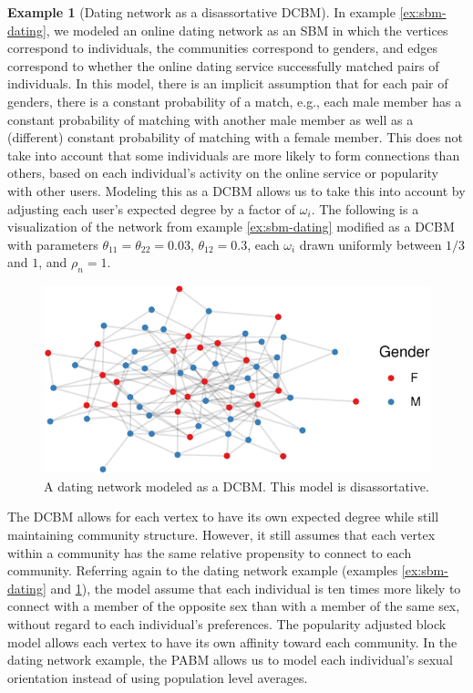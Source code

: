 \documentclass[
  12pt,
]{article}
\theoremstyle{definition}
\theoremstyle{definition}
\newtheorem{example}{Example}[section]
\theoremstyle{definition}
\theoremstyle{definition}
\theoremstyle{remark}
\begin{document}
\begin{example}[Dating network as a disassortative DCBM]
\label{ex:dcbm-dating}
In example \ref{ex:sbm-dating}, we modeled an online dating network as an SBM in which the vertices correspond to individuals, the communities correspond to genders, and edges correspond to whether the online dating service successfully matched pairs of individuals. 
In this model, there is an implicit assumption that for each pair of genders, there is a constant probability of a match, e.g., each male member has a constant probability of matching with another male member as well as a (different) constant probability of matching with a female member. 
This does not take into account that some individuals are more likely to form connections than others, based on each individual's activity on the online service or popularity with other users. 
Modeling this as a DCBM allows us to take this into account by adjusting each user's expected degree by a factor of $\omega_i$. 
The following is a visualization of the network from example \ref{ex:sbm-dating} modified as a DCBM with parameters $\theta_{11} = \theta_{22} = 0.03$, $\theta_{12} = 0.3$, each $\omega_i$ drawn uniformly between $1/3$ and $1$, and $\rho_n = 1$. 

\begin{figure}[H]

{\centering \includegraphics{draft_files/figure-latex/dating-dcbm-1} 

}

\caption{A dating network modeled as a DCBM. This model is disassortative.}\label{fig:dating-dcbm}
\end{figure}
\end{example}

The DCBM allows for each vertex to have its own expected degree while still maintaining community structure.
However, it still assumes that each vertex within a community has the same relative propensity to connect to each community.
Referring again to the dating network example (examples \ref{ex:sbm-dating} and \ref{ex:dcbm-dating}), the model assume that each individual is ten times more likely to connect with a member of the opposite sex than with a member of the same sex, without regard to each individual's preferences.
The popularity adjusted block model \citep{307cbeb9b1be48299388437423d94bf1} allows each vertex to have its own affinity toward each community.
In the dating network example, the PABM allows us to model each individual's sexual orientation instead of using population level averages.
\end{document}
